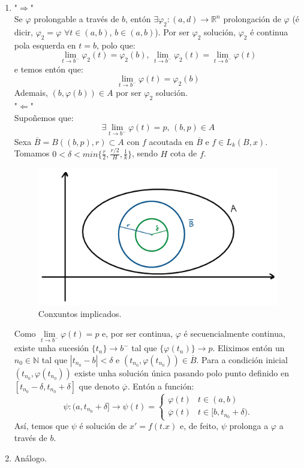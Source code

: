 \documentclass[11pt, a4paper,twoside]{article}
\makeatletter
\theoremstyle{theorem-style}  %
\renewenvironment{proof}[1][\proofname]{\par
	\pushQED{\qed}%
	\normalfont \topsep6\p@\@plus6\p@\relax
	\list{}{%
		\settowidth{\leftmargin}{\quad:\hskip\labelsep}%
		\setlength{\labelwidth}{0pt}%
		\setlength{\itemindent}{-\leftmargin}%
	}%
	\item[\hskip\labelsep\itshape#1\@addpunct{:}]\ignorespaces
}{%
	\popQED\endlist\@endpefalse
}
\theoremstyle{definition-style}
\theoremstyle{example-style}
\providecommand{\abs}[1]{\left\lvert#1\right\rvert} %
\makeatother
\begin{document}
\begin{proof}\ 
	\begin{enumerate} [\quad i)]
		\item "$\Rightarrow$" \\
		Se $\varphi$ prolongable a través de $b$, entón $\exists \varphi_2 : (a, d) \longrightarrow \mathbb{R}^n$ prolongación de $\varphi$ (é dicir, $\varphi_2 = \varphi$ $\forall t \in (a, b)$, $b \in (a, b)$). Por ser $\varphi_2$ solución, $\varphi_2$ é continua pola esquerda en $t = b$, polo que:
		\[\lim\limits_{t \to b^-} \varphi_2(t) = \varphi_2(b) \text{, } \lim\limits_{t \to b^-} \varphi_2(t) = \lim\limits_{t \to b^-} \varphi(t)\]
		e temos entón que:
		\[\lim\limits_{t \to b^-} \varphi(t) = \varphi_2(b)\]
		Ademais, $(b, \varphi(b)) \in A$ por ser $\varphi_2$ solución. \\
		"$\Leftarrow$" \\
		Supoñemos que:
		\[\exists \lim\limits_{t \to b^-} \varphi(t) = p \text{, } (b, p) \in A\]
		Sexa $\overline{B} = B((b, p), r) \subset A$ con $f$ acoutada en $\overline{B}$ e $f \in L_k (B, x)$. Tomamos $0 < \delta < min\{\frac{r}{2}, \frac{r/2}{H}, \frac{1}{k}\}$, sendo $H$ cota de $f$.
		
		\begin{figure}[h]
			\centering
			\includegraphics[scale=0.3]{prolongacion}
			\caption{Conxuntos implicados.}
		\end{figure}
		
		Como $\lim\limits_{t \to b^-} \varphi (t) = p$ e, por ser continua, $ \varphi $ é secuencialmente continua, existe unha sucesión $\{t_n\} \longrightarrow b^-$ tal que $\{\varphi(t_n)\} \longrightarrow p$. Eliximos entón un $n_0 \in \mathbb{N}$ tal que $\abs{t_{n_0} - b} < \delta$ e $(t_{n_0}, \varphi (t_{n_0})) \in \overline{B}$. Para a condición inicial $(t_{n_0}, \varphi (t_{n_0}))$ existe unha solución única pasando polo punto definido en $[t_{n_0} - \delta, t_{n_0} + \delta]$ que denoto $\overline{\varphi}$. Entón a función:
		\[\psi: (a, t_{n_0} + \delta] \longrightarrow \psi (t) = \begin{cases}
		\varphi(t) &t \in (a, b) \\ 
		\overline{\varphi} (t) &t \in [b, t_{n_0} + \delta).
		\end{cases}\]
		Así, temos que $\psi$ é solución de $x' = f(t. x)$ e, de feito, $\psi$ prolonga a $\varphi$ a través de $b$.
		\item Análogo.
	\end{enumerate} 
\end{proof}
\end{document}
